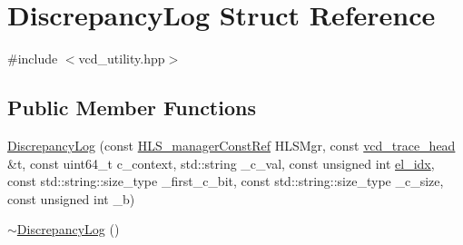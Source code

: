 \hypertarget{structDiscrepancyLog}{}\section{Discrepancy\+Log Struct Reference}
\label{structDiscrepancyLog}


{\ttfamily \#include $<$vcd\+\_\+utility.\+hpp$>$}

\subsection*{Public Member Functions}
\begin{DoxyCompactItemize}
\item 
\hyperlink{structDiscrepancyLog_a4aeef0545b10b424577486acd4f5cc4c}{Discrepancy\+Log} (const \hyperlink{hls__manager_8hpp_a1b481383e3beabc89bd7562ae672dd8c}{H\+L\+S\+\_\+manager\+Const\+Ref} H\+L\+S\+Mgr, const \hyperlink{structvcd__trace__head}{vcd\+\_\+trace\+\_\+head} \&t, const uint64\+\_\+t c\+\_\+context, std\+::string \+\_\+c\+\_\+val, const unsigned int \hyperlink{structDiscrepancyLog_a44d4a9cc80f7f51095a518e842115927}{el\+\_\+idx}, const std\+::string\+::size\+\_\+type \+\_\+first\+\_\+c\+\_\+bit, const std\+::string\+::size\+\_\+type \+\_\+c\+\_\+size, const unsigned int \+\_\+b)
\item 
\hyperlink{structDiscrepancyLog_ab2c76140d93db653da99ae6629e9d9a8}{$\sim$\+Discrepancy\+Log} ()
\end{DoxyCompactItemize}
